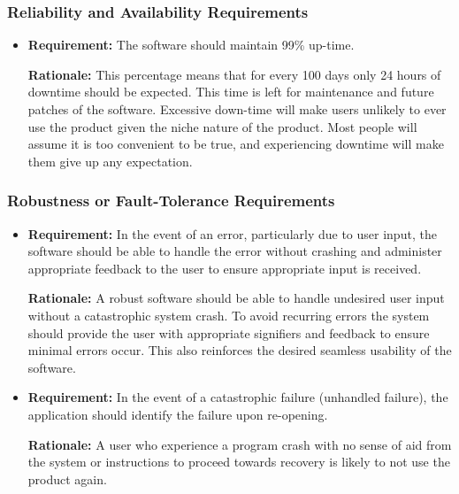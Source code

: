 \documentclass[12pt, titlepage]{article}
\begin{document}
\subsubsection{Reliability and Availability Requirements}
\begin{itemize}
    \item \textbf{Requirement:} The software should maintain 99\% up-time.
    
    \textbf{Rationale:} This percentage means that for every 100 days only 24 hours of downtime should be expected. This time is left for maintenance and future patches of the software. Excessive down-time will make users unlikely to ever use the product given the niche nature of the product. Most people will assume it is too convenient to be true, and experiencing downtime will make them give up any expectation.
\end{itemize}

\subsubsection{Robustness or Fault-Tolerance Requirements}
\begin{itemize}
    \item \textbf{Requirement:} In the event of an error, particularly due to user input, the software should be able to handle the error without crashing and administer appropriate feedback to the user to ensure appropriate input is received.
    
    \textbf{Rationale:} A robust software should be able to handle undesired user input without a catastrophic system crash. To avoid recurring errors the system should provide the user with appropriate signifiers and feedback to ensure minimal errors occur. This also reinforces the desired seamless usability of the software.
    
    \item \textbf{Requirement:} In the event of a catastrophic failure (unhandled failure), the application should identify the failure upon re-opening.
    
    \textbf{Rationale:} A user who experience a program crash with no sense of aid from the system or instructions to proceed towards recovery is likely to not use the product again.
\end{itemize}
\end{document}
